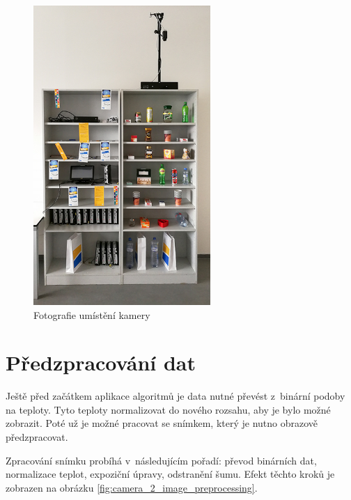   \begin{figure}[h]
    \centering
    \includegraphics[width=0.6\textwidth]{images/shelf_setup.jpg}
    \caption{Fotografie umístění kamery}
    \label{fig:shelf_setup}
  \end{figure}    

\section{Předzpracování dat}
Ještě před začátkem aplikace algoritmů je data nutné převést z~binární podoby na teploty. Tyto teploty normalizovat do nového rozsahu, aby je bylo možné zobrazit. Poté už je možné pracovat se snímkem, který je nutno obrazově předzpracovat. 

Zpracování snímku probíhá v~následujícím pořadí: převod binárních dat, normalizace teplot, expoziční úpravy, odstranění šumu. Efekt těchto kroků je zobrazen na obrázku \ref{fig:camera_2_image_preprocessing}. 

